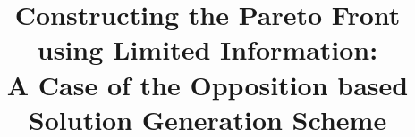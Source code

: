 \documentclass{sig-alternate-05-2015}
\begin{document}






%

\title{Constructing the Pareto Front using Limited Information:\\A Case of the Opposition based Solution Generation Scheme%
}
%
%
%
%
%
\end{document}
